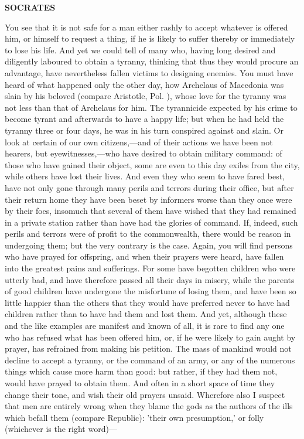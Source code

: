 \documentclass[11pt,letter]{article}
\begin{document}
\par \textbf{SOCRATES}
\par   You see that it is not safe for a man either rashly to accept whatever is offered him, or himself to request a thing, if he is likely to suffer thereby or immediately to lose his life. And yet we could tell of many who, having long desired and diligently laboured to obtain a tyranny, thinking that thus they would procure an advantage, have nevertheless fallen victims to designing enemies. You must have heard of what happened only the other day, how Archelaus of Macedonia was slain by his beloved (compare Aristotle, Pol. ), whose love for the tyranny was not less than that of Archelaus for him. The tyrannicide expected by his crime to become tyrant and afterwards to have a happy life; but when he had held the tyranny three or four days, he was in his turn conspired against and slain. Or look at certain of our own citizens,—and of their actions we have been not hearers, but eyewitnesses,—who have desired to obtain military command:  of those who have gained their object, some are even to this day exiles from the city, while others have lost their lives. And even they who seem to have fared best, have not only gone through many perils and terrors during their office, but after their return home they have been beset by informers worse than they once were by their foes, insomuch that several of them have wished that they had remained in a private station rather than have had the glories of command. If, indeed, such perils and terrors were of profit to the commonwealth, there would be reason in undergoing them; but the very contrary is the case. Again, you will find persons who have prayed for offspring, and when their prayers were heard, have fallen into the greatest pains and sufferings. For some have begotten children who were utterly bad, and have therefore passed all their days in misery, while the parents of good children have undergone the misfortune of losing them, and have been so little happier than the others that they would have preferred never to have had children rather than to have had them and lost them. And yet, although these and the like examples are manifest and known of all, it is rare to find any one who has refused what has been offered him, or, if he were likely to gain aught by prayer, has refrained from making his petition. The mass of mankind would not decline to accept a tyranny, or the command of an army, or any of the numerous things which cause more harm than good:  but rather, if they had them not, would have prayed to obtain them. And often in a short space of time they change their tone, and wish their old prayers unsaid. Wherefore also I suspect that men are entirely wrong when they blame the gods as the authors of the ills which befall them (compare Republic):  'their own presumption,' or folly (whichever is the right word)—
\end{document}
